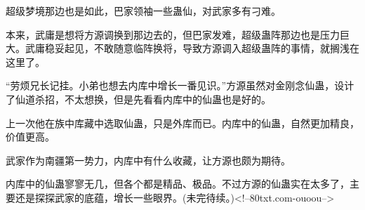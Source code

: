 \begin{this_body}
超级梦境那边也是如此，巴家领袖一些蛊仙，对武家多有刁难。

本来，武庸是想将方源调换到那边去的，但巴家发难，超级蛊阵那边也是压力巨大。武庸稳妥起见，不敢随意临阵换将，导致方源调入超级蛊阵的事情，就搁浅在这里了。

“劳烦兄长记挂。小弟也想去内库中增长一番见识。”方源虽然对金刚念仙蛊，设计了仙道杀招，不太想换，但是先看看内库中的仙蛊也是好的。

上一次他在族中库藏中选取仙蛊，只是外库而已。内库中的仙蛊，自然更加精良，价值更高。

武家作为南疆第一势力，内库中有什么收藏，让方源也颇为期待。

内库中的仙蛊寥寥无几，但各个都是精品、极品。不过方源的仙蛊实在太多了，主要还是探探武家的底蕴，增长一些眼界。(未完待续。)<!--80txt.com-ouoou-->

\end{this_body}

